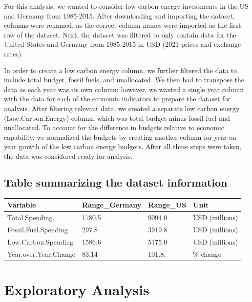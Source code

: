 \documentclass[
  12pt,
]{article}
\begin{document}
For this analysis, we wanted to consider low-carbon energy investments
in the US and Germany from 1985-2015. After downloading and importing
the dataset, columns were renamed, as the correct column names were
imported as the first row of the dataset. Next, the dataset was filtered
to only contain data for the United States and Germany from 1985-2015 in
USD (2021 prices and exchange rates).

In order to create a low carbon energy column, we further filtered the
data to include total budget, fossil fuels, and unallocated. We then had
to transpose the data as each year was its own column; however, we
wanted a single year column with the data for each of the economic
indicators to prepare the dataset for analysis. After filtering relevant
data, we created a separate low carbon energy (Low.Carbon.Energy)
column, which was total budget minus fossil fuel and unallocated. To
account for the difference in budgets relative to economic capability,
we normalized the budgets by creating another column for year-on-year
growth of the low carbon energy budgets. After all these steps were
taken, the data was considered ready for analysis.

\hypertarget{table-summarizing-the-dataset-information}{%
\subsection{Table summarizing the dataset
information}\label{table-summarizing-the-dataset-information}}

\begin{longtable}[]{@{}llll@{}}
\toprule()
Variable & Range\_Germany & Range\_US & Unit \\
\midrule()
\endhead
Total.Spending. & 1780.5 & 9094.0 & USD (millions) \\
Fossil.Fuel.Spending & 297.8 & 3919.8 & USD (millions) \\
Low.Carbon.Spending & 1586.6 & 5175.0 & USD (millions) \\
Year.over.Year.Change & 83.14 & 101.8. & \% change \\
\bottomrule()
\end{longtable}

\newpage

\hypertarget{exploratory-analysis}{%
\section{Exploratory Analysis}\label{exploratory-analysis}}
\end{document}
